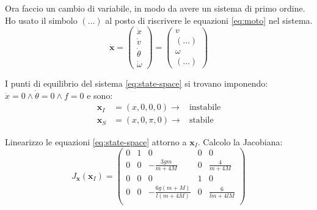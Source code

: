 Ora faccio un cambio di variabile, in modo da avere un sistema di primo ordine.
Ho usato il simbolo $(\ldots)$ al posto di riscrivere le equazioni \eqref{eq:moto} nel sistema.
\begin{equation}
  \dot {\mathbf x} = \left(
  \begin{matrix}
    \dot x \\
    \dot v \\
    \dot \theta \\
    \dot \omega
  \end{matrix}\right) = \left(
  \begin{matrix}
    v \\
    (\ldots) \\
    \omega \\
    (\ldots)
  \end{matrix}
  \right)
  \label{eq:state-space}
\end{equation}

I punti di equilibrio del sistema \eqref{eq:state-space} si trovano imponendo: $\dot x = 0 \land \dot \theta = 0
\land f = 0$ e sono:
\begin{equation}
  \begin{aligned}
    \mathbf x_I &= (x, 0, 0, 0) \to & \text{instabile} \\
    \mathbf x_S &= (x, 0, \pi, 0) \to & \text{stabile}
  \end{aligned}
  \label{eq:punti-equilibrio}
\end{equation}

Linearizzo le equazioni \eqref{eq:state-space} attorno a $\mathbf x_I$.
Calcolo la Jacobiana:
\begin{equation}
  J_{\dot{\mathbf x}}(\mathbf x_I) =
  \left(\begin{array}{ccccc}0&1&0&0&0\\0&0&-\frac{3gm}{m+4M}&0&\frac{4}{m+4M}\\0&0&0&1&0\\0&0&-\frac{6g(m+M)}{l(m+4M)}&0&\frac{6}{lm+4lM}\\\end{array}\right)
  \label{eq:jacobiana}
\end{equation}

